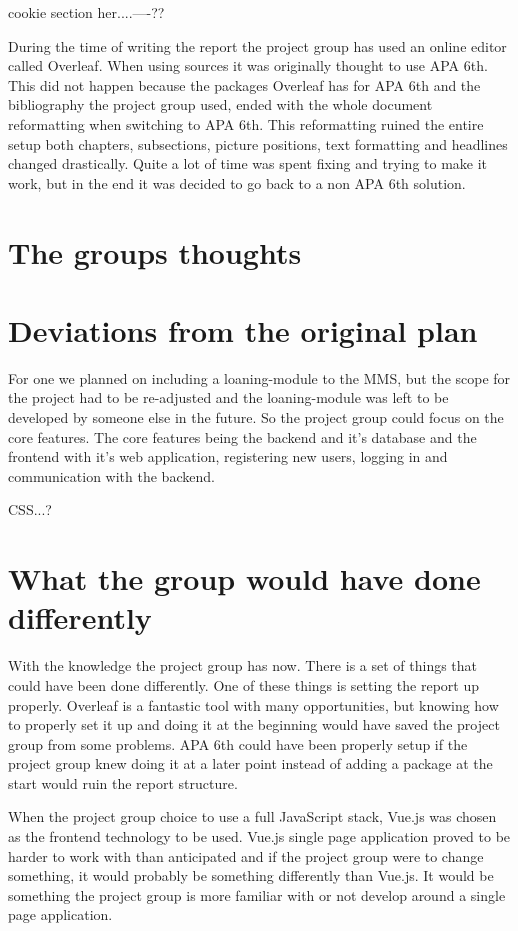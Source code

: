 cookie section her....----??

During the time of writing the report the project group has used an online editor called Overleaf. When using sources it was originally thought to use APA 6th. This did not happen because the packages Overleaf has for APA 6th and the bibliography the project group used, ended with the whole document reformatting when switching to APA 6th. This reformatting ruined the entire setup both chapters, subsections, picture positions, text formatting and headlines changed drastically. Quite a lot of time was spent fixing and trying to make it work, but in the end it was decided to go back to a non APA 6th solution. 

\section{The groups thoughts}

\section{Deviations from the original plan}
For one we planned on including a loaning-module to the MMS, but the scope for the project had to be re-adjusted and the loaning-module was left to be developed by someone else in the future. So the project group could focus on the core features. The core features being the backend and it's database and the frontend with it's web application, registering new users, logging in and communication with the backend. 

CSS...?
\section{What the group would have done differently}
With the knowledge the project group has now. There is a set of things that could have been done differently. One of these things is setting the report up properly. Overleaf is a fantastic tool with many opportunities, but knowing how to properly set it up and doing it at the beginning would have saved the project group from some problems. APA 6th could have been properly setup if the project group knew doing it at a later point instead of adding a package at the start would ruin the report structure.

When the project group choice to use a full JavaScript stack, Vue.js was chosen as the frontend technology to be used. Vue.js single page application proved to be harder to work with than anticipated and if the project group were to change something, it would probably be something differently than Vue.js. It would be something the project group is more familiar with or not develop around a single page application.  

